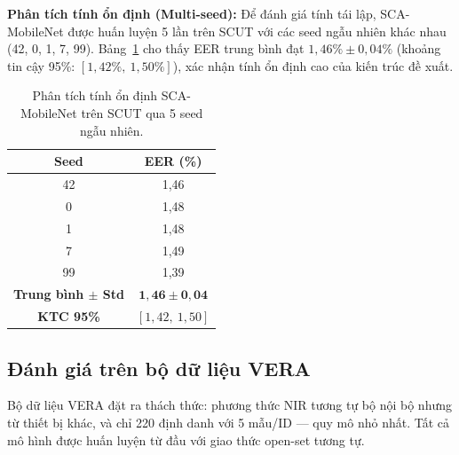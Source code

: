 \documentclass[12pt,a4paper]{article}
\begin{document}
\textbf{Phân tích tính ổn định (Multi-seed):} Để đánh giá tính tái lập, SCA-MobileNet được huấn luyện 5 lần trên SCUT với các seed ngẫu nhiên khác nhau (42, 0, 1, 7, 99). Bảng~\ref{tab:multi_seed} cho thấy EER trung bình đạt $1{,}46\% \pm 0{,}04\%$ (khoảng tin cậy 95\%: $[1{,}42\%,~1{,}50\%]$), xác nhận tính ổn định cao của kiến trúc đề xuất.

\begin{table}[H]
\caption{Phân tích tính ổn định SCA-MobileNet trên SCUT qua 5 seed ngẫu nhiên.}
\begin{center}
\begin{tabular}{c|c}
\hline
\textbf{Seed} & \textbf{EER (\%)} \\
\hline
42 & 1,46 \\
0 & 1,48 \\
1 & 1,48 \\
7 & 1,49 \\
99 & 1,39 \\
\hline
\textbf{Trung bình $\pm$ Std} & $\mathbf{1{,}46 \pm 0{,}04}$ \\
\textbf{KTC 95\%} & $[1{,}42,~1{,}50]$ \\
\hline
\end{tabular}
\label{tab:multi_seed}
\end{center}
\end{table}

\subsection{Đánh giá trên bộ dữ liệu VERA}

Bộ dữ liệu VERA đặt ra thách thức: phương thức NIR tương tự bộ nội bộ nhưng từ thiết bị khác, và chỉ 220 định danh với 5 mẫu/ID --- quy mô nhỏ nhất. Tất cả mô hình được huấn luyện từ đầu với giao thức open-set tương tự.
\end{document}
